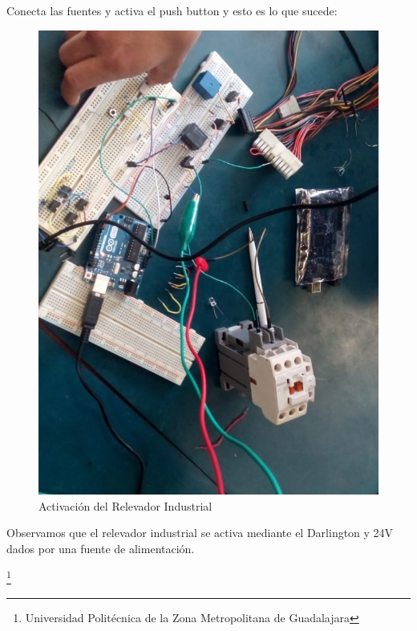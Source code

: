 \documentclass[10pt,a4paper]{article}
\begin{document}
Conecta las fuentes y activa el push button y esto es lo que sucede: \\
\begin{figure}[hbtp]
\centering
\includegraphics[scale=0.3]{Pictures/Industrial.jpeg}
\caption{Activación del Relevador Industrial}
\end{figure}

Observamos que el relevador industrial se activa mediante el Darlington y 24V dados por una fuente de alimentación.

\footnote{Universidad Politécnica de la Zona Metropolitana de Guadalajara}
 
\newpage
\end{document}
